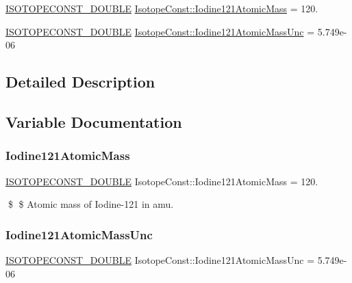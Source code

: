 \begin{DoxyCompactItemize}
\item 
\mbox{\hyperlink{group___isotope_const-_macros_ga8f45a7272ce02c0b4c65c44636ed719a}{I\+S\+O\+T\+O\+P\+E\+C\+O\+N\+S\+T\+\_\+\+D\+O\+U\+B\+LE}} \mbox{\hyperlink{group___isotope_const-_iodine-_i121_gacdc29819de761ed2d57166d5e8b88832}{Isotope\+Const\+::\+Iodine121\+Atomic\+Mass}} = 120.
\item 
\mbox{\hyperlink{group___isotope_const-_macros_ga8f45a7272ce02c0b4c65c44636ed719a}{I\+S\+O\+T\+O\+P\+E\+C\+O\+N\+S\+T\+\_\+\+D\+O\+U\+B\+LE}} \mbox{\hyperlink{group___isotope_const-_iodine-_i121_gaad09dd48d2bf737052fba394676a4878}{Isotope\+Const\+::\+Iodine121\+Atomic\+Mass\+Unc}} = 5.\+749e-\/06
\end{DoxyCompactItemize}


\subsection{Detailed Description}


\subsection{Variable Documentation}
\mbox{\label{group___isotope_const-_iodine-_i121_gacdc29819de761ed2d57166d5e8b88832}} 
\subsubsection{\texorpdfstring{Iodine121\+Atomic\+Mass}{Iodine121AtomicMass}}
{\footnotesize\ttfamily \mbox{\hyperlink{group___isotope_const-_macros_ga8f45a7272ce02c0b4c65c44636ed719a}{I\+S\+O\+T\+O\+P\+E\+C\+O\+N\+S\+T\+\_\+\+D\+O\+U\+B\+LE}} Isotope\+Const\+::\+Iodine121\+Atomic\+Mass = 120.}

\$ \$ Atomic mass of Iodine-\/121 in amu. \mbox{\label{group___isotope_const-_iodine-_i121_gaad09dd48d2bf737052fba394676a4878}} 
\subsubsection{\texorpdfstring{Iodine121\+Atomic\+Mass\+Unc}{Iodine121AtomicMassUnc}}
{\footnotesize\ttfamily \mbox{\hyperlink{group___isotope_const-_macros_ga8f45a7272ce02c0b4c65c44636ed719a}{I\+S\+O\+T\+O\+P\+E\+C\+O\+N\+S\+T\+\_\+\+D\+O\+U\+B\+LE}} Isotope\+Const\+::\+Iodine121\+Atomic\+Mass\+Unc = 5.\+749e-\/06}

